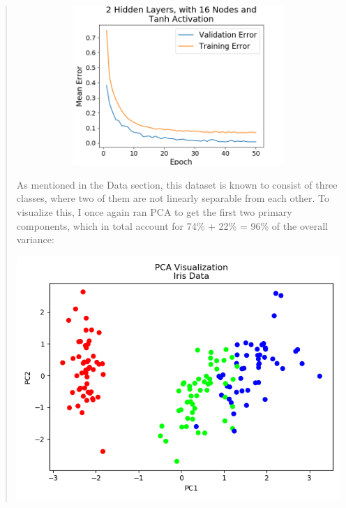\documentclass{article}
\begin{document}
\begin{quote}
\begin{figure}[h!]
\begin{subfigure}[h]{0.23\textwidth}
		\includegraphics[width=\textwidth]{figs/Iris_Multiclass_Classification_2_Hidden_Layers_with_16_Nodes_and_Tanh_Activation.png}
	\end{subfigure}
\end{figure}
	\setlength{\parindent}{10ex}
	As mentioned in the Data section, this dataset is known to consist of three classes, where two of them are not linearly separable from each other. To visualize this, I once again ran PCA to get the first two primary components, which in total account for 74\% + 22\% = 96\% of the overall variance:
	
		\begin{center}
		\includegraphics[scale=0.3]{figs/iris_PCA.png}
	\end{center}


\end{quote}
\end{document}
